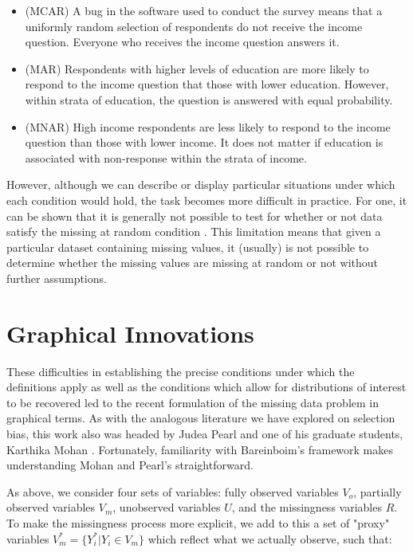 \documentclass[12pt,twoside]{reedthesis}
\theoremstyle{definition}
\begin{document}
\begin{itemize}
\item (MCAR) A bug in the software used to conduct the survey means that a uniformly random selection of respondents do not receive the income question. Everyone who receives the income question answers it. 

\item (MAR) Respondents with higher levels of education are more likely to respond to the income question that those with lower education. However, within strata of education, the question is answered with equal probability.

\item (MNAR) High income respondents are less likely to respond to the income question than those with lower income. It does not matter if education is associated with non-response within the strata of income.  
\end{itemize}



However, although we can describe or display particular situations under which each condition would hold, the task becomes more difficult in practice. For one, it can be shown that it is generally not possible to test for whether or not data satisfy the missing at random condition \citep{Schafer_2002}. This limitation means that given a particular dataset containing missing values, it  (usually) is not possible to determine whether the missing values are missing at random or not without further assumptions.
\section{Graphical Innovations}

These difficulties in establishing the precise conditions under which the definitions apply as well as the conditions which allow for distributions of interest to be recovered led to the recent formulation of the missing data problem in graphical terms. As with the analogous literature we have explored on selection bias, this work also was headed by Judea Pearl and one of his graduate students, Karthika Mohan \citep{Mohan_2013} \citep{Mohan_2019}. Fortunately, familiarity with Bareinboim's framework makes understanding Mohan and Pearl's straightforward. 

As above, we consider four sets of variables: fully observed variables $V_o$, partially observed variables $V_m$, unobserved variables $U$, and the missingness variables $R$. To make the missingness process more explicit, we add to this a set of "proxy" variables $V^*_m = \{Y_i^* | Y_i \in V_m\}$ which reflect what we actually observe, such that:
\end{document}
